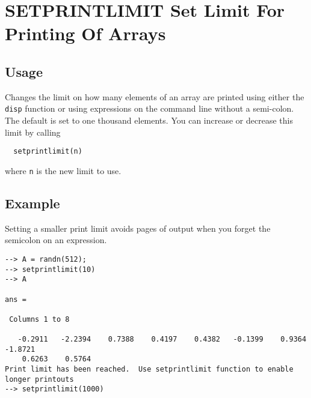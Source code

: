 \section{SETPRINTLIMIT Set Limit For Printing Of Arrays}

\subsection{Usage}

Changes the limit on how many elements of an array are printed
using either the \verb|disp| function or using expressions on the
command line without a semi-colon.  The default is set to 
one thousand elements.  You can increase or decrease this
limit by calling
\begin{verbatim}
  setprintlimit(n)
\end{verbatim}
where \verb|n| is the new limit to use.
\subsection{Example}

Setting a smaller print limit avoids pages of output when you forget the semicolon on an expression.
\begin{verbatim}
--> A = randn(512);
--> setprintlimit(10)
--> A

ans = 

 Columns 1 to 8

   -0.2911   -2.2394    0.7388    0.4197    0.4382   -0.1399    0.9364   -1.8721 
    0.6263    0.5764
Print limit has been reached.  Use setprintlimit function to enable longer printouts
--> setprintlimit(1000)
\end{verbatim}
